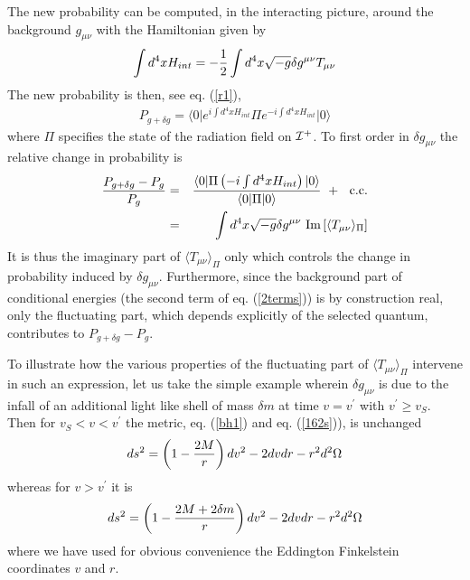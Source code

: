 The new probability can be computed, in the interacting picture,
around the background $g_{\mu\nu}$ with the Hamiltonian given by
\begin{equation}
\int d^4x H_{int} = -{1\over 2} \int d^4x \sqrt{-g} \delta g^{\mu\nu}
T_{\mu\nu}
\label{backreact}
\end{equation}
The new probability is then, see eq. (\ref{r1}),
\begin{eqnarray}
P_{g+\delta g}
= \langle 0 \vert
e^{i\int d^4x H_{int}}
\Pi
e^{-i\int d^4x H_{int}}
 \vert 0 \rangle
\label{rr1}
\end{eqnarray}
where $\Pi$ specifies the state of the radiation field on ${\cal I}^+$.
To first order in $\delta g_{\mu\nu}$
 the relative change in
probability is
\begin{eqnarray}
{
P_{g+\delta g}  -P_{g}  \over P_{g} }
&=& {
\langle  0 \vert \Pi
\left( -i\int d^4x H_{int}\right)
 \vert 0 \rangle
\over \langle 0 \vert  \Pi \vert 0 \rangle } \ +\ \mbox{ c.c.}\nonumber\\
&=&
\int d^4x \sqrt{-g} \delta g^{\mu\nu}
\mbox{ Im} \left[ \langle T_{\mu\nu} \rangle_{\Pi} \right]
\label{rr2}
\end{eqnarray}
It is thus the imaginary part of $\langle T_{\mu\nu} \rangle_{\Pi}$
only which controls the change in probability induced by $\delta g_{\mu\nu}$.
Furthermore, since the background part of conditional energies (the second
term of eq. (\ref{2terms})) is by construction real, only the fluctuating
part, which depends explicitly of the selected quantum,
 contributes to $P_{g+\delta g}  -P_{g}$.

To illustrate how the various properties of
the fluctuating part of $\langle T_{\mu\nu} \rangle_{\Pi}$ intervene
in such an expression, let us take
the simple example wherein $\delta g_{\mu\nu}$ is due to the infall of an
additional
light like shell of mass $\delta m$ at time $v=v^\prime$ with $v^\prime
\geq v_S$. Then for $v_S<v<v^\prime$ the metric, eq. (\ref{bh1}) and eq.
(\ref{162s})), is unchanged
\begin{equation}
ds^2 = \left( 1 -{2M\over r}\right) dv^2 -2dvdr -r^2 d^2\Omega
\label{rr3}\end{equation}
whereas for $v>v^\prime$ it is
\begin{equation}
ds^2 = \left( 1 -{2M+ 2\delta m \over r}\right) dv^2 -2dvdr -r^2 d^2\Omega
\label{rr4}\end{equation}
where we have used for obvious convenience the Eddington Finkelstein
 coordinates $v$ and $r$.

